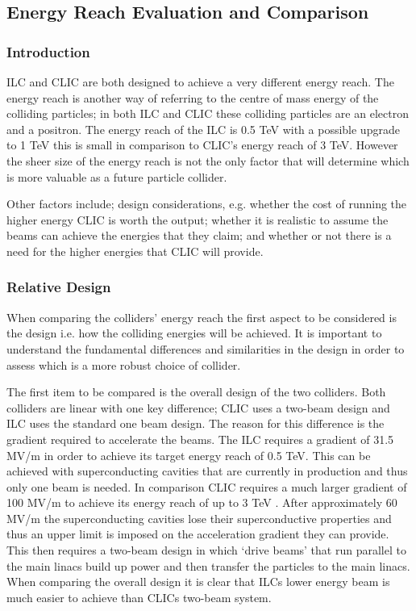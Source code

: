 \subsection{Energy Reach Evaluation and Comparison}

\subsubsection{Introduction}
ILC and CLIC are both designed to achieve a very different energy reach. The energy reach is another way of referring to the centre of mass energy of the colliding particles; in both ILC and CLIC these colliding particles are an electron and a positron.  The energy reach of the ILC is 0.5 TeV with a possible upgrade to 1 TeV this is small in comparison to CLIC's energy reach of 3 TeV. However the sheer size of the energy reach is not the only factor that will determine which is more valuable as a future particle collider.

Other factors include; design considerations, e.g. whether the cost of running the higher energy CLIC is worth the output; whether it is realistic to assume the beams can achieve the energies that they claim; and whether or not there is a need for the higher energies that CLIC will provide.

\subsubsection{Relative Design}
When comparing the colliders' energy reach the first aspect to be considered is the design i.e. how the colliding energies will be achieved. It is important to understand the fundamental differences and similarities in the design in order to assess which is a more robust choice of collider.

The first item to be compared is the overall design of the two colliders. Both colliders are linear with one key difference; CLIC uses a two-beam design and ILC uses the standard one beam design. The reason for this difference is the gradient required to accelerate the beams. The ILC requires a gradient of 31.5 MV/m \cite{ILC:ReferenceDesignReport} in order to achieve its target energy reach of 0.5 TeV. This can be achieved with superconducting cavities that are currently in production and thus only one beam is needed. In comparison CLIC requires a much larger gradient of 100 MV/m to achieve its energy reach of up to 3 TeV \cite{CLIC:ParameterList}. After approximately 60 MV/m the superconducting cavities lose their superconductive properties and thus an upper limit is imposed on the acceleration gradient they can provide. This then requires a two-beam design in which `drive beams' that run parallel to the main linacs build up power and then transfer the particles to the main linacs. When comparing the overall design it is clear that ILCs lower energy beam is much easier to achieve than CLICs two-beam system.

